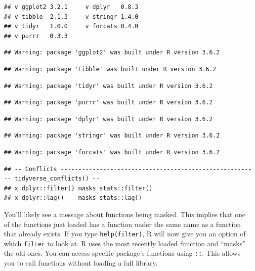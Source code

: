 \documentclass[
]{book}
\theoremstyle{definition}
\theoremstyle{definition}
\theoremstyle{definition}
\theoremstyle{remark}
\begin{document}
\begin{verbatim}
## v ggplot2 3.2.1     v dplyr   0.8.3
## v tibble  2.1.3     v stringr 1.4.0
## v tidyr   1.0.0     v forcats 0.4.0
## v purrr   0.3.3
\end{verbatim}

\begin{verbatim}
## Warning: package 'ggplot2' was built under R version 3.6.2
\end{verbatim}

\begin{verbatim}
## Warning: package 'tibble' was built under R version 3.6.2
\end{verbatim}

\begin{verbatim}
## Warning: package 'tidyr' was built under R version 3.6.2
\end{verbatim}

\begin{verbatim}
## Warning: package 'purrr' was built under R version 3.6.2
\end{verbatim}

\begin{verbatim}
## Warning: package 'dplyr' was built under R version 3.6.2
\end{verbatim}

\begin{verbatim}
## Warning: package 'stringr' was built under R version 3.6.2
\end{verbatim}

\begin{verbatim}
## Warning: package 'forcats' was built under R version 3.6.2
\end{verbatim}

\begin{verbatim}
## -- Conflicts -------------------------------------------------------- tidyverse_conflicts() --
## x dplyr::filter() masks stats::filter()
## x dplyr::lag()    masks stats::lag()
\end{verbatim}

You'll likely see a message about functions being masked. This implies that one of the functions just loaded has a function under the same name as a function that already exists. If you type \texttt{help(filter)}, R will now give you an option of which \texttt{filter} to look at. R uses the most recently loaded function and ``masks'' the old ones. You can access specific package's functions using \texttt{::}. This allows you to call functions without loading a full library.
\end{document}

